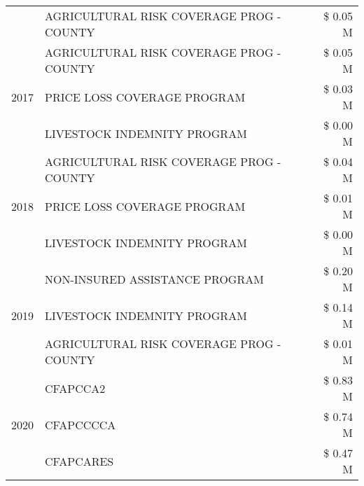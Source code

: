 \begin{tabular}{llr}
 & AGRICULTURAL RISK COVERAGE PROG - COUNTY      & \$ 0.05 M \\
\cline{1-3}
\multirow[t]{3}{*}{2017} & AGRICULTURAL RISK COVERAGE PROG - COUNTY & \$ 0.05 M \\
 & PRICE LOSS COVERAGE PROGRAM & \$ 0.03 M \\
 & LIVESTOCK INDEMNITY PROGRAM & \$ 0.00 M \\
\cline{1-3}
\multirow[t]{3}{*}{2018} & AGRICULTURAL RISK COVERAGE PROG - COUNTY & \$ 0.04 M \\
 & PRICE LOSS COVERAGE PROGRAM & \$ 0.01 M \\
 & LIVESTOCK INDEMNITY PROGRAM & \$ 0.00 M \\
\cline{1-3}
\multirow[t]{3}{*}{2019} & NON-INSURED ASSISTANCE PROGRAM & \$ 0.20 M \\
 & LIVESTOCK INDEMNITY PROGRAM & \$ 0.14 M \\
 & AGRICULTURAL RISK COVERAGE PROG - COUNTY & \$ 0.01 M \\
\cline{1-3}
\multirow[t]{3}{*}{2020} & CFAPCCA2 & \$ 0.83 M \\
 & CFAPCCCCA & \$ 0.74 M \\
 & CFAPCARES & \$ 0.47 M \\
\cline{1-3}
\bottomrule
\end{tabular}
